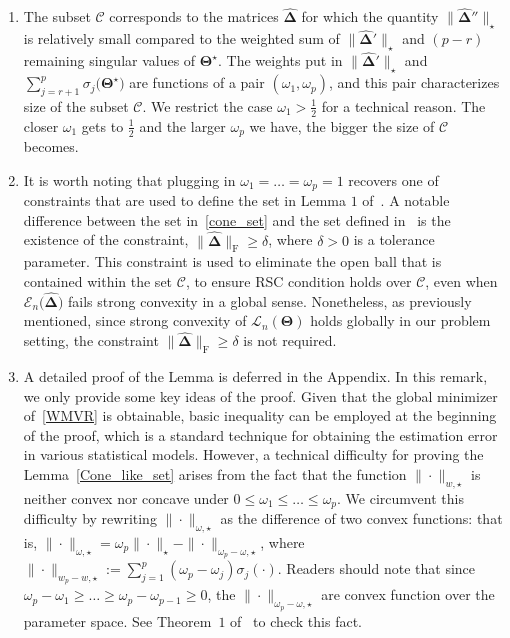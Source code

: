 \documentclass[alpha-refs]{wiley-article}
\begin{document}
\begin{enumerate}
    \item The subset $\mathcal{C}$ corresponds to the matrices $\boldsymbol{\widehat{\Delta}}$ for which the quantity $\|\boldsymbol{\widehat{\Delta}}''\|_{\star}$ is relatively small compared to the weighted sum of $\|\boldsymbol{\widehat{\Delta}}'\|_{\star}$ and $(p-r)$ remaining singular values of $\boldsymbol{\Theta}^{\star}$.
    The weights put in $\|\boldsymbol{\widehat{\Delta}}'\|_{\star}$ and $\sum_{j=r+1}^{p}\sigma_{j}\big(\boldsymbol{\Theta^{\star}}\big)$ are functions of a pair $(\omega_{1},\omega_{p})$, and this pair characterizes size of the subset $\mathcal{C}$.
    We restrict the case $\omega_{1} > \frac{1}{2}$ for a technical reason.
    The closer $\omega_{1}$ gets to $\frac{1}{2}$ and the larger $\omega_{p}$ we have, the bigger the size of $\mathcal{C}$  becomes.

    \item It is worth noting that plugging in $\omega_{1}=\dots=\omega_{p}=1$ recovers one of constraints that are used to define the set in Lemma $1$ of~\citet{negahban2011estimation}.
    A notable difference between the set in~\eqref{cone_set} and the set defined in~\citet{negahban2011estimation} is the existence of the constraint, $\|\boldsymbol{\widehat{\Delta}}\|_{\text{F}} \geq \delta$, where $\delta>0$ is a tolerance parameter.
    This constraint is used to eliminate the open ball that is contained within the set $\mathcal{C}$, to ensure RSC condition holds over $\mathcal{C}$, even when $\mathcal{E}_{n}\big(\boldsymbol{\widehat{\Delta}})$ fails strong convexity in a global sense.
    Nonetheless, as previously mentioned, since strong convexity of $\mathcal{L}_{n}(\boldsymbol{\Theta})$ holds globally in our problem setting, the constraint $\|\boldsymbol{\widehat{\Delta}}\|_{\text{F}} \geq \delta$ is not required.

    \item A detailed proof of the Lemma is deferred in the Appendix.
    In this remark, we only provide some key ideas of the proof.
    Given that the global minimizer of~\eqref{WMVR} is obtainable, basic inequality can be employed at the beginning of the proof,
    which is a standard technique for obtaining the estimation error in various statistical models.
    However, a technical difficulty for proving the Lemma~\ref{Cone_like_set} arises from the fact that the function $\| \cdot \|_{w,\star}$ is neither convex nor concave under $0\leq \omega_{1}\leq\dots \leq \omega_{p}$.
    We circumvent this difficulty by rewriting $\| \cdot \|_{\omega,\star}$ as the difference of two convex functions: that is,
    $\| \cdot \|_{\omega,\star} = \omega_{p} \| \cdot \|_{\star} - \| \cdot \|_{\omega_{p}-\omega,\star}$,
    where $\| \cdot \|_{w_{p}-w,\star}:=\sum_{j=1}^{p}(\omega_{p}-\omega_{j})\sigma_{j}(\cdot)$.
    Readers should note that since $\omega_{p}-\omega_{1} \geq \dots \geq \omega_{p}-\omega_{p-1}\geq 0$, the $\| \cdot \|_{\omega_{p}-\omega,\star}$ are convex function over the parameter space.
    See Theorem~$1$ of~\cite{chen2013reduced} to check this fact.
\end{enumerate}
\end{document}
